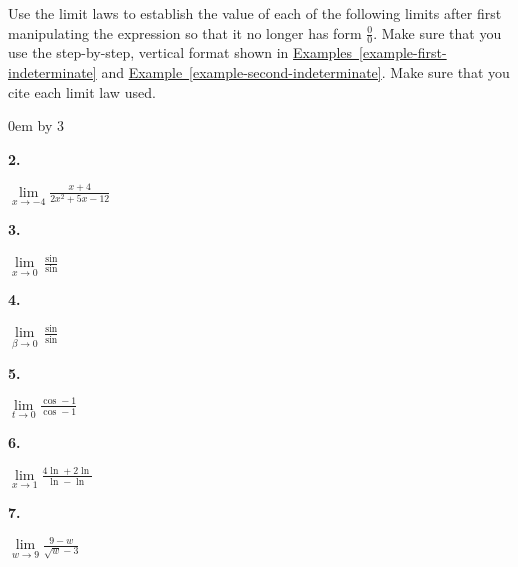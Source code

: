 \documentclass[12pt,]{book}
\theoremstyle{plain}
\theoremstyle{definition}
\numberwithin{equation}{section}
\newenvironment{exercisegroup}%
{\medskip\noindent}%
{\par\bigskip}%
\newlength{\exercisegroupindent}%
\newlength{\exercisegroupitemwidth}%
\newenvironment{exercisegrouplist}%
{\vspace{-\partopsep}%
\begin{adjustwidth}{\exercisegroupindent}{0em}}%
{\end{adjustwidth}%
\vspace{-\partopsep}%
\vspace{\baselineskip}}%
\newenvironment{exercisegroupbyrow}[1]%
{\begin{exercisegrouplist}%
\setlength{\parindent}{0em}%
\setlength{\exercisegroupitemwidth}{\linewidth}%
\addtolength{\exercisegroupitemwidth}{\columnsep}%
\divide\exercisegroupitemwidth by #1%
\addtolength{\exercisegroupitemwidth}{-\columnsep}}%
{\end{exercisegrouplist}}%
\newenvironment{exercisegroupitem}[1]%
{\begin{minipage}[t]{\exercisegroupitemwidth}
\vspace{0pt}%
{\bfseries#1}%
\rule{0pt}{\baselineskip}}{\strut%
\end{minipage}%
\hspace{\columnsep}}%
\providecommand\phantomsection{}
\newcommand{\fe}[2]{\mathop{{#1}{\left(#2\right)}}}
\begin{document}
\begin{exercisegroup}%
Use the limit laws to establish the value of each of the following limits after first manipulating the expression so that it
no longer has form \(\frac{0}{0}\). Make sure that you use the step-by-step, vertical format shown in \hyperref[example-first-indeterminate]{Examples~\ref*{example-first-indeterminate}} and \hyperref[example-second-indeterminate]{Example~\ref*{example-second-indeterminate}}. Make sure that you cite each limit law used.%
\par
\begin{exercisegroupbyrow}{3}%
\begin{exercisegroupitem}{2. }\phantomsection\hypertarget{exercise-73}{\null}
\(\lim\limits_{x\to-4}\frac{x+4}{2x^2+5x-12}\)%
\end{exercisegroupitem}%
\begin{exercisegroupitem}{3. }\phantomsection\hypertarget{exercise-74}{\null}
\(\lim\limits_{x\to0}\frac{\fe{\sin}{2x}}{\fe{\sin}{x}}\)%
\end{exercisegroupitem}%
\begin{exercisegroupitem}{4. }\phantomsection\hypertarget{exercise-75}{\null}
\(\lim\limits_{\beta\to0}\frac{\fe{\sin}{\beta+\pi}}{\fe{\sin}{\beta}}\)%
\end{exercisegroupitem}%
\par%
\begin{exercisegroupitem}{5. }\phantomsection\hypertarget{exercise-76}{\null}
\(\lim\limits_{t\to0}\frac{\fe{\cos}{2t}-1}{\fe{\cos}{t}-1}\)%
\end{exercisegroupitem}%
\begin{exercisegroupitem}{6. }\phantomsection\hypertarget{exercise-77}{\null}
\(\lim\limits_{x\to1}\frac{4\fe{\ln}{x}+2\fe{\ln}{x^3}}{\fe{\ln}{x}-\fe{\ln}{\sqrt{x}}}\)%
\end{exercisegroupitem}%
\begin{exercisegroupitem}{7. }\phantomsection\hypertarget{exercise-78}{\null}
\(\lim\limits_{w\to9}\frac{9-w}{\sqrt{w}-3}\)%
\end{exercisegroupitem}%
\par%
\end{exercisegroupbyrow}%
\end{exercisegroup}%
\typeout{************************************************}
\typeout{************************************************}
\end{document}
